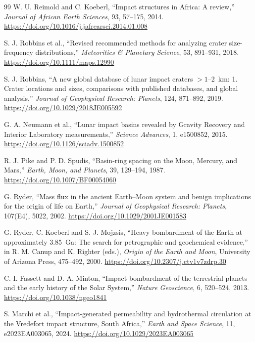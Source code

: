 \documentclass[11pt]{article}
\begin{document}
\begin{thebibliography}{99}
W. U. Reimold and C. Koeberl, ``Impact structures in Africa: A review,'' \emph{Journal of African Earth Sciences}, 93, 57--175, 2014. \url{https://doi.org/10.1016/j.jafrearsci.2014.01.008}

S. J. Robbins et al., ``Revised recommended methods for analyzing crater size-frequency distributions,'' \emph{Meteoritics \& Planetary Science}, 53, 891--931, 2018. \url{https://doi.org/10.1111/maps.12990}

S. J. Robbins, ``A new global database of lunar impact craters $>1$--2~km: 1. Crater locations and sizes, comparisons with published databases, and global analysis,'' \emph{Journal of Geophysical Research: Planets}, 124, 871--892, 2019. \url{https://doi.org/10.1029/2018JE005592}

G. A. Neumann et al., ``Lunar impact basins revealed by Gravity Recovery and Interior Laboratory measurements,'' \emph{Science Advances}, 1, e1500852, 2015. \url{https://doi.org/10.1126/sciadv.1500852}

R. J. Pike and P. D. Spudis, ``Basin-ring spacing on the Moon, Mercury, and Mars,'' \emph{Earth, Moon, and Planets}, 39, 129--194, 1987. \url{https://doi.org/10.1007/BF00054060}

G. Ryder, ``Mass flux in the ancient Earth--Moon system and benign implications for the origin of life on Earth,'' \emph{Journal of Geophysical Research: Planets}, 107(E4), 5022, 2002. \url{https://doi.org/10.1029/2001JE001583}

G. Ryder, C. Koeberl and S. J. Mojzsis, ``Heavy bombardment of the Earth at approximately 3.85~Ga: The search for petrographic and geochemical evidence,'' in R. M. Canup and K. Righter (eds.), \emph{Origin of the Earth and Moon}, University of Arizona Press, 475--492, 2000. \url{https://doi.org/10.2307/j.ctv1v7zdrp.30}

C. I. Fassett and D. A. Minton, ``Impact bombardment of the terrestrial planets and the early history of the Solar System,'' \emph{Nature Geoscience}, 6, 520--524, 2013. \url{https://doi.org/10.1038/ngeo1841}

S. Marchi et al., ``Impact-generated permeability and hydrothermal circulation at the Vredefort impact structure, South Africa,'' \emph{Earth and Space Science}, 11, e2023EA003065, 2024. \url{https://doi.org/10.1029/2023EA003065}


\end{thebibliography}
\end{document}
